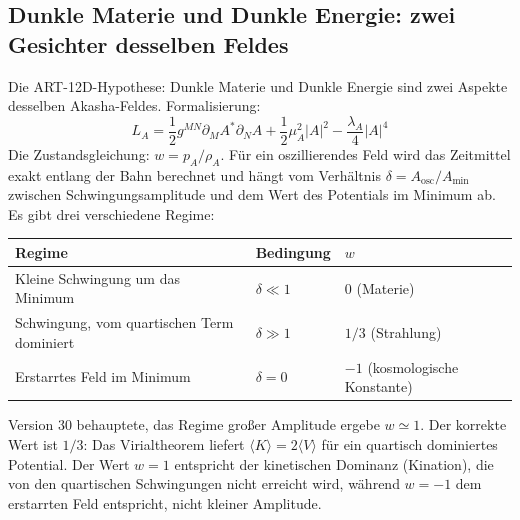 \subsection{Dunkle Materie und Dunkle Energie: zwei Gesichter desselben Feldes}
Die ART-12D-Hypothese: Dunkle Materie und Dunkle Energie sind zwei Aspekte desselben Akasha-Feldes. Formalisierung:
\begin{equation}
L_A = \frac{1}{2} g^{MN} \partial_M A^* \partial_N A + \frac{1}{2} \mu_A^2 |A|^2 - \frac{\lambda_A}{4} |A|^4
\end{equation}
Die Zustandsgleichung: $w = p_A / \rho_A$. Für ein oszillierendes Feld wird das Zeitmittel exakt entlang der Bahn berechnet und hängt vom Verhältnis $\delta = A_{\text{osc}}/A_{\min}$ zwischen Schwingungsamplitude und dem Wert des Potentials im Minimum ab. Es gibt drei verschiedene Regime:
\begin{center}
\begin{tabular}{@{}lll@{}}
\toprule
\textbf{Regime} & \textbf{Bedingung} & $w$ \\ \midrule
Kleine Schwingung um das Minimum & $\delta \ll 1$ & $0$ (Materie) \\
Schwingung, vom quartischen Term dominiert & $\delta \gg 1$ & $1/3$ (Strahlung) \\
Erstarrtes Feld im Minimum & $\delta = 0$ & $-1$ (kosmologische Konstante) \\ \bottomrule
\end{tabular}
\end{center}
Version 30 behauptete, das Regime großer Amplitude ergebe $w \simeq 1$. Der korrekte Wert ist $1/3$: Das Virialtheorem liefert $\langle K \rangle = 2\langle V \rangle$ für ein quartisch dominiertes Potential. Der Wert $w = 1$ entspricht der kinetischen Dominanz (Kination), die von den quartischen Schwingungen nicht erreicht wird, während $w = -1$ dem erstarrten Feld entspricht, nicht kleiner Amplitude.
